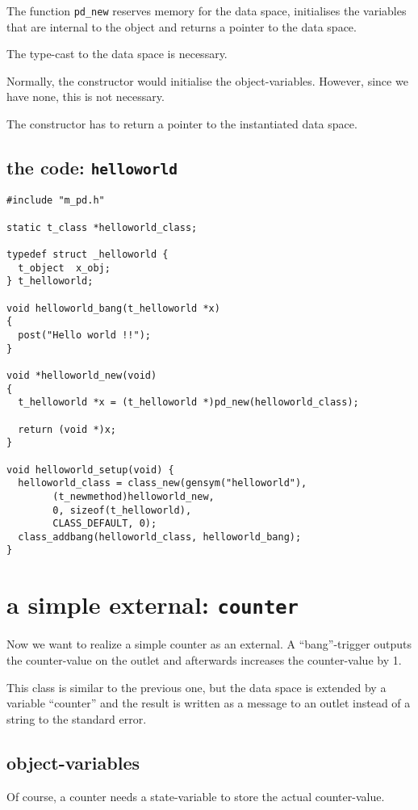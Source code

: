 \documentclass[12pt, a4paper,english,titlepage]{article}
\begin{document}
The function \verb+pd_new+ reserves memory for the data space,
initialises the variables that are internal to the object and
returns a pointer to the data space.

The type-cast to the data space is necessary.

Normally, the constructor would initialise the object-variables.
However, since we have none, this is not necessary.


The constructor has to return a pointer to the instantiated data space.

\subsection{the code: \tt helloworld}

\begin{verbatim}
#include "m_pd.h"

static t_class *helloworld_class;

typedef struct _helloworld {
  t_object  x_obj;
} t_helloworld;

void helloworld_bang(t_helloworld *x)
{
  post("Hello world !!");
}

void *helloworld_new(void)
{
  t_helloworld *x = (t_helloworld *)pd_new(helloworld_class);

  return (void *)x;
}

void helloworld_setup(void) {
  helloworld_class = class_new(gensym("helloworld"),
        (t_newmethod)helloworld_new,
        0, sizeof(t_helloworld),
        CLASS_DEFAULT, 0);
  class_addbang(helloworld_class, helloworld_bang);
}
\end{verbatim}


\section{a simple external: {\tt counter}}

Now we want to realize a simple counter as an external.
A ``bang''-trigger outputs the counter-value on the outlet and
afterwards increases the counter-value by 1.

This class is similar to the previous one,
but the data space is extended by a variable ``counter'' and the
result is written as a message to an outlet instead of 
a string to the standard error.

\subsection{object-variables}
Of course, a counter needs a state-variable to store the actual counter-value.
\end{document}
